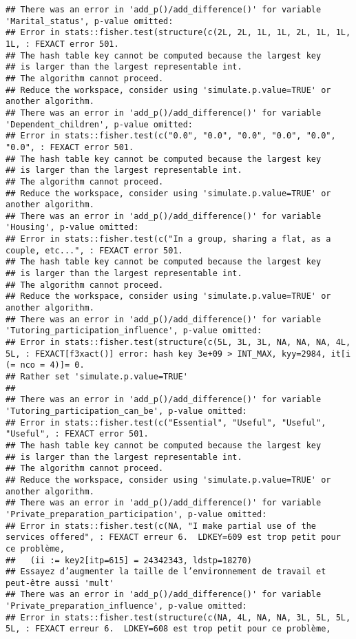 \documentclass[
]{article}
\begin{document}
\begin{verbatim}
## There was an error in 'add_p()/add_difference()' for variable 'Marital_status', p-value omitted:
## Error in stats::fisher.test(structure(c(2L, 2L, 1L, 1L, 2L, 1L, 1L, 1L, : FEXACT error 501.
## The hash table key cannot be computed because the largest key
## is larger than the largest representable int.
## The algorithm cannot proceed.
## Reduce the workspace, consider using 'simulate.p.value=TRUE' or another algorithm.
## There was an error in 'add_p()/add_difference()' for variable 'Dependent_children', p-value omitted:
## Error in stats::fisher.test(c("0.0", "0.0", "0.0", "0.0", "0.0", "0.0", : FEXACT error 501.
## The hash table key cannot be computed because the largest key
## is larger than the largest representable int.
## The algorithm cannot proceed.
## Reduce the workspace, consider using 'simulate.p.value=TRUE' or another algorithm.
## There was an error in 'add_p()/add_difference()' for variable 'Housing', p-value omitted:
## Error in stats::fisher.test(c("In a group, sharing a flat, as a couple, etc...", : FEXACT error 501.
## The hash table key cannot be computed because the largest key
## is larger than the largest representable int.
## The algorithm cannot proceed.
## Reduce the workspace, consider using 'simulate.p.value=TRUE' or another algorithm.
## There was an error in 'add_p()/add_difference()' for variable 'Tutoring_participation_influence', p-value omitted:
## Error in stats::fisher.test(structure(c(5L, 3L, 3L, NA, NA, NA, 4L, 5L, : FEXACT[f3xact()] error: hash key 3e+09 > INT_MAX, kyy=2984, it[i (= nco = 4)]= 0.
## Rather set 'simulate.p.value=TRUE'
## 
## There was an error in 'add_p()/add_difference()' for variable 'Tutoring_participation_can_be', p-value omitted:
## Error in stats::fisher.test(c("Essential", "Useful", "Useful", "Useful", : FEXACT error 501.
## The hash table key cannot be computed because the largest key
## is larger than the largest representable int.
## The algorithm cannot proceed.
## Reduce the workspace, consider using 'simulate.p.value=TRUE' or another algorithm.
## There was an error in 'add_p()/add_difference()' for variable 'Private_preparation_participation', p-value omitted:
## Error in stats::fisher.test(c(NA, "I make partial use of the services offered", : FEXACT erreur 6.  LDKEY=609 est trop petit pour ce problème,
##   (ii := key2[itp=615] = 24342343, ldstp=18270)
## Essayez d’augmenter la taille de l’environnement de travail et peut-être aussi 'mult'
## There was an error in 'add_p()/add_difference()' for variable 'Private_preparation_influence', p-value omitted:
## Error in stats::fisher.test(structure(c(NA, 4L, NA, NA, 3L, 5L, 5L, 5L, : FEXACT erreur 6.  LDKEY=608 est trop petit pour ce problème,

\end{verbatim}
\end{document}
